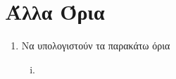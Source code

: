 \section{Άλλα Όρια}

\begin{enumerate}
    \item Να υπολογιστούν τα παρακάτω όρια
        \begin{enumerate}[i)]
            \item 
        \end{enumerate}
\end{enumerate}


